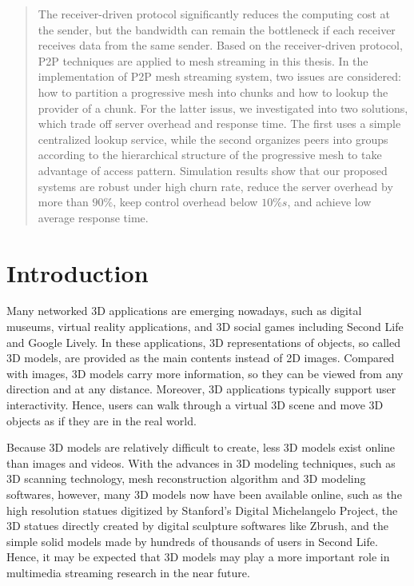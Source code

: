 \documentclass[11pt, a4paper]{report}
\begin{document}
\begin{abstract}
    The receiver-driven protocol significantly reduces the computing cost at the sender,
    but the bandwidth can remain the bottleneck if each receiver receives data
    from the same sender. 
    Based on the receiver-driven protocol, P2P techniques are applied to mesh
    streaming in this thesis. In the implementation of P2P mesh streaming system,
    two issues are considered: how to partition a progressive mesh into chunks and 
    how to lookup the provider of a chunk. For the latter issus, we investigated 
    into two solutions, which trade off server overhead and response time. The first
    uses a simple centralized lookup service, while the second organizes peers into
    groups according to the hierarchical structure of the progressive mesh to 
    take advantage of access pattern. Simulation results show that our 
    proposed systems are robust under high churn rate, reduce the server overhead
    by more than $90\%$, keep control overhead below $10\%s$, and achieve
    low average response time.
\end{abstract}
\chapter{Introduction}
\label{c:intro}
    Many networked 3D applications are emerging nowadays, 
    such as digital museums, virtual reality applications, 
    and 3D social games including Second Life and Google Lively. 
    In these applications, 3D representations of objects, 
    so called 3D models, are provided as the main contents instead of 2D images. 
    Compared with images, 3D models carry more information, 
    so they can be viewed from any direction and at any distance. 
    Moreover, 3D applications typically support user interactivity. 
    Hence, users can walk through a virtual 3D scene and move 3D objects
    as if they are in the real world. 

    Because 3D models are relatively difficult to create, 
    less 3D models exist online than images and videos. 
    With the advances in 3D modeling techniques, 
    such as 3D scanning technology, mesh reconstruction algorithm
    and 3D modeling softwares, however, many 3D models now have been available online, 
    such as the high resolution statues digitized by Stanford’s Digital Michelangelo Project,
    the 3D statues directly created by digital sculpture softwares like Zbrush, 
    and the simple solid models made by hundreds of thousands of users in Second Life. 
    Hence, it may be expected that 3D models may play a more important role 
    in multimedia streaming research in the near future.
\end{document}
